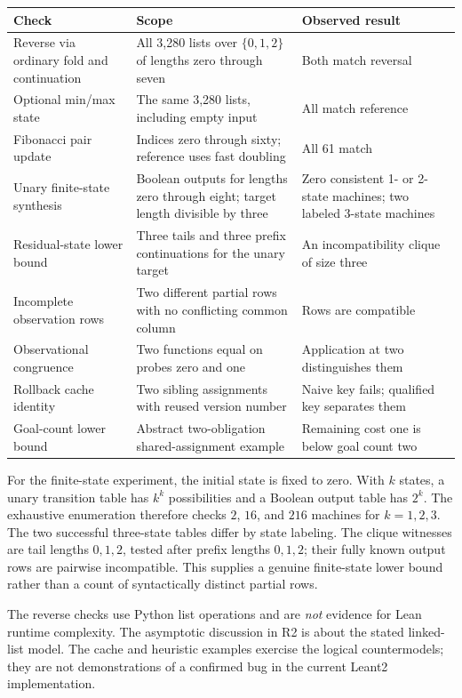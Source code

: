 \documentclass[11pt,a4paper]{article}
\theoremstyle{definition}
\theoremstyle{remark}
\begin{document}
\begin{longtable}{@{}L{49mm}L{66mm}L{36mm}@{}}
\toprule
Check & Scope & Observed result\\
\midrule\endhead
Reverse via ordinary fold and continuation & All 3,280 lists over $\{0,1,2\}$ of lengths zero through seven & Both match reversal\\
Optional min/max state & The same 3,280 lists, including empty input & All match reference\\
Fibonacci pair update & Indices zero through sixty; reference uses fast doubling & All 61 match\\
Unary finite-state synthesis & Boolean outputs for lengths zero through eight; target length divisible by three & Zero consistent 1- or 2-state machines; two labeled 3-state machines\\
Residual-state lower bound & Three tails and three prefix continuations for the unary target & An incompatibility clique of size three\\
Incomplete observation rows & Two different partial rows with no conflicting common column & Rows are compatible\\
Observational congruence & Two functions equal on probes zero and one & Application at two distinguishes them\\
Rollback cache identity & Two sibling assignments with reused version number & Naive key fails; qualified key separates them\\
Goal-count lower bound & Abstract two-obligation shared-assignment example & Remaining cost one is below goal count two\\
\bottomrule
\end{longtable}

For the finite-state experiment, the initial state is fixed to zero. With $k$
states, a unary transition table has $k^k$ possibilities and a Boolean output
table has $2^k$. The exhaustive enumeration therefore checks $2$, $16$, and
$216$ machines for $k=1,2,3$. The two successful three-state tables differ by
state labeling. The clique witnesses are tail lengths $0,1,2$, tested after
prefix lengths $0,1,2$; their fully known output rows are pairwise incompatible.
This supplies a genuine finite-state lower bound rather than a count of
syntactically distinct partial rows.

The reverse checks use Python list operations and are \emph{not} evidence for
Lean runtime complexity. The asymptotic discussion in R2 is about the stated
linked-list model. The cache and heuristic examples exercise the logical
countermodels; they are not demonstrations of a confirmed bug in the current
Leant2 implementation.
\end{document}
